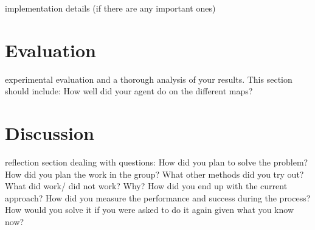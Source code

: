 \documentclass[a4paper,11pt]{article}
\begin{document}
implementation details (if there are any important ones)
\section{Evaluation}
experimental evaluation and a thorough analysis of your results. This section should include:
How well did your agent do on the different maps?
\section{Discussion}
reflection section dealing with questions: How did you plan to solve the problem? How did you plan the work in the group? What other methods did you try out? What did work/ did not work? Why? How did you end up with the current approach? How did you measure the performance and success during the process? How would you solve it if you were asked to do it again given what you know now?

\printbibliography
\end{document}
